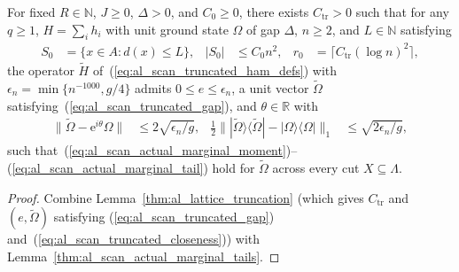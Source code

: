 \begin{lemma}
    \label{thm:al_scan_exists_marginal_tails}
    \leanok
    For fixed $R\in\mathbb N$, $J\ge0$, $\Delta>0$, and $C_0\ge0$, there exists
    $C_{\mathrm{tr}}>0$ such that for any $q\ge1$, $H=\sum_i h_i$ with unit
    ground state $\Omega$ of gap $\Delta$, $n\ge2$, and $L\in\mathbb N$ satisfying
    \begin{align}
        S_0   & =\{x\in A:d(x)\le L\},                   &
        |S_0| & \le C_0n^2,                              &
        r_0   & =\lceil C_{\mathrm{tr}}(\log n)^2\rceil,
        \label{eq:al_scan_truncation_collar_scales}
    \end{align}
    the operator $\widetilde H$ of~(\ref{eq:al_scan_truncated_ham_defs}) with
    $\epsilon_n=\min\{n^{-1000},g/4\}$ admits $0\le e\le\epsilon_n$, a unit
    vector $\widetilde\Omega$ satisfying~(\ref{eq:al_scan_truncated_gap}), and
    $\theta\in\mathbb R$ with
    \begin{align}
        \|\widetilde\Omega-\mathrm e^{i\theta}\Omega\|
         & \le2\sqrt{\epsilon_n/g}, &
        \frac12\bigl\||\widetilde\Omega\rangle\langle\widetilde\Omega|
        -|\Omega\rangle\langle\Omega|\bigr\|_1
         & \le\sqrt{2\epsilon_n/g},
        \label{eq:al_scan_truncated_closeness}
    \end{align}
    such that~(\ref{eq:al_scan_actual_marginal_moment})--(\ref{eq:al_scan_actual_marginal_tail})
    hold for $\widetilde\Omega$ across every cut $X\subseteq\Lambda$.
\end{lemma}
\begin{proof}\leanok
    Combine Lemma~\ref{thm:al_lattice_truncation} (which gives
    $C_{\mathrm{tr}}$ and $(e,\widetilde\Omega)$ satisfying
    (\ref{eq:al_scan_truncated_gap}) and~(\ref{eq:al_scan_truncated_closeness}))
    with Lemma~\ref{thm:al_scan_actual_marginal_tails}.
\end{proof}


